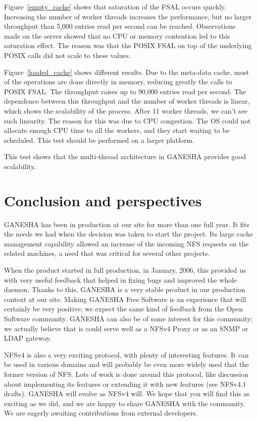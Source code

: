\documentclass[final]{ols}
\begin{document}
Figure~\ref{empty_cache} shows that saturation of the FSAL occurs
quickly. Increasing the number of worker threads increases the
performance, but no larger throughput than 5,000 entries read per
second can be reached. Observations made on the server showed that no
CPU or memory contention led to this saturation effect. The
reason was that the POSIX FSAL on top of the underlying POSIX calls did
not scale to these values.

Figure~\ref{loaded_cache} shows different results. Due to the
meta-data cache, most of the operations are done directly in memory,
reducing greatly the calls to POSIX FSAL. The throughput raises up to
90,000 entries read per second. The dependence between this throughput
and the number of worker threads is linear, which shows the scalability
of the process. After 11 worker threads, we can't see such linearity.
The reason for this was due to CPU congestion. The OS could not
allocate enough CPU time to all the workers, and they start waiting to be
scheduled. This test should be performed on a larger platform.

This test shows that the multi-thread architecture in GANESHA provides
good scalability.
 

\section{Conclusion and perspectives}

GANESHA has been in production at our site for more than one full year. It
fits the needs we had when the decision was taken to start the
project. Its large cache management capability allowed an increase of the
incoming NFS requests on the related machines, a need that was
critical for several other projects.

When the product started in full production, in January, 2006, this
provided us with very useful feedback that helped in fixing bugs and
improved the whole daemon. Thanks to this, GANESHA is a very stable
product in our production context at our site. Making GANESHA  Free
Software is an experience that will certainly be very positive; we
expect the same kind of feedback from the Open Software community.
GANESHA can also be of some interest for this community; we actually
believe that is could serve well as a NFSv4 Proxy or as an SNMP or LDAP
gateway.

NFSv4 is also a very exciting protocol, with plenty of interesting
features. It can be used in various domains and will probably be even
more widely used that the former version of NFS. Lots of work is done
around this protocol, like discussion about implementing its features
or extending it with new features (see NFSv4.1 drafts). GANESHA will
evolve as NFSv4 will. We hope that you will find this as exciting as we did,
and we are happy to share GANESHA with the community.  We
are eagerly awaiting contributions from external developers.
\end{document}
